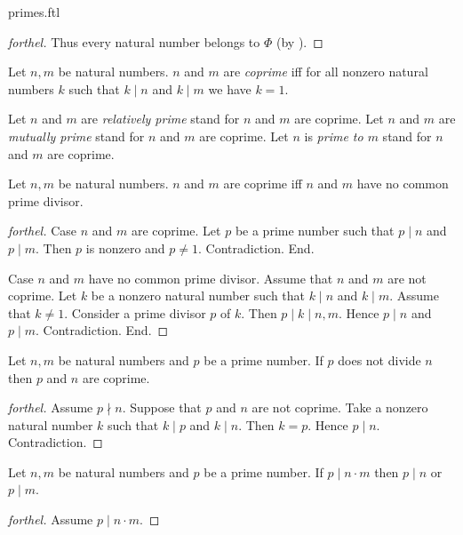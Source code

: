 \documentclass{naproche-library}
\begin{document}
\begin{smodule}[title=Prime Numbers]{primes.ftl}
\begin{proof}[forthel]
  Thus every natural number belongs to $\Phi$ (by ).
\end{proof}

\begin{definition}[forthel,id=ARITHMETIC_10_463197419077632]
  Let $n, m$ be natural numbers.
  $n$ and $m$ are \emph{coprime} iff for all nonzero natural numbers $k$ such that $k \mid n$ and $k \mid m$ we have $k = 1$.

  Let $n$ and $m$ are \emph{relatively prime} stand for $n$ and $m$ are coprime.
  Let $n$ and $m$ are \emph{mutually prime} stand for $n$ and $m$ are coprime.
  Let $n$ is \emph{prime to $m$} stand for $n$ and $m$ are coprime.
\end{definition}

\begin{proposition}[forthel,id=ARITHMETIC_10_5776394594287616]
  Let $n, m$ be natural numbers.
  $n$ and $m$ are coprime iff $n$ and $m$ have no common prime divisor.
\end{proposition}
\begin{proof}[forthel]
  Case $n$ and $m$ are coprime.
    Let $p$ be a prime number such that $p \mid n$ and $p \mid m$.
    Then $p$ is nonzero and $p \neq 1$.
    Contradiction.
  End.

  Case $n$ and $m$ have no common prime divisor.
    Assume that $n$ and $m$ are not coprime.
    Let $k$ be a nonzero natural number such that $k \mid n$ and $k \mid m$.
    Assume that $k \neq 1$.
    Consider a prime divisor $p$ of $k$.
    Then $p \mid k \mid n,m$.
    Hence $p \mid n$ and $p \mid m$.
    Contradiction.
  End.
\end{proof}

\begin{proposition}[forthel,id=ARITHMETIC_10_7212152851005440]
  Let $n, m$ be natural numbers and $p$ be a prime number.
  If $p$ does not divide $n$ then $p$ and $n$ are coprime.
\end{proposition}
\begin{proof}[forthel]
  Assume $p \nmid n$.
  Suppose that $p$ and $n$ are not coprime.
  Take a nonzero natural number $k$ such that $k \mid p$ and $k \mid n$.
  Then $k = p$.
  Hence $p \mid n$.
  Contradiction.
\end{proof}

\begin{proposition}[forthel,id=ARITHMETIC_10_8313676557713408]
  Let $n, m$ be natural numbers and $p$ be a prime number.
  If $p \mid n \cdot m$ then $p \mid n$ or $p \mid m$.
\end{proposition}
\begin{proof}[forthel]
  Assume $p \mid n \cdot m$.


\end{proof}
\end{smodule}
\end{document}
